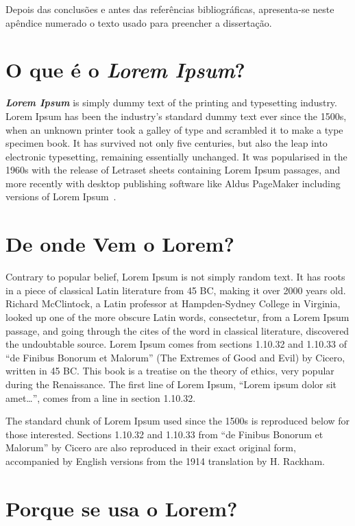 Depois das conclusões e antes das referências bibliográficas,
apresenta-se neste apêndice numerado o texto usado para preencher a
dissertação.

\section{O que é o \emph{Lorem Ipsum}?}

\emph{\textbf{Lorem Ipsum}} is simply dummy text of the printing and
typesetting industry. Lorem Ipsum has been the industry's standard
dummy text ever since the 1500s, when an unknown printer took a galley
of type and scrambled it to make a type specimen book. It has survived
not only five centuries, but also the leap into electronic
typesetting, remaining essentially unchanged. It was popularised in
the 1960s with the release of Letraset sheets containing Lorem Ipsum
passages, and more recently with desktop publishing software like
Aldus PageMaker including versions of Lorem Ipsum~\citep{kn:Lip08}. 

\section{De onde Vem o Lorem?}

Contrary to popular belief, Lorem Ipsum is not simply random text. It
has roots in a piece of classical Latin literature from 45 BC, making
it over 2000 years old. Richard McClintock, a Latin professor at
Hampden-Sydney College in Virginia, looked up one of the more obscure
Latin words, consectetur, from a Lorem Ipsum passage, and going
through the cites of the word in classical literature, discovered the
undoubtable source. Lorem Ipsum comes from sections 1.10.32 and
1.10.33 of ``de Finibus Bonorum et Malorum'' (The Extremes of Good and
Evil) by Cicero, written in 45 BC. This book is a treatise on the
theory of ethics, very popular during the Renaissance. The first line
of Lorem Ipsum, ``Lorem ipsum dolor sit amet\ldots'', comes from a line in
section 1.10.32.

The standard chunk of Lorem Ipsum used since the 1500s is reproduced
below for those interested. Sections 1.10.32 and 1.10.33 from ``de
Finibus Bonorum et Malorum'' by Cicero are also reproduced in their
exact original form, accompanied by English versions from the 1914
translation by H. Rackham.

\section{Porque se usa o Lorem?}

